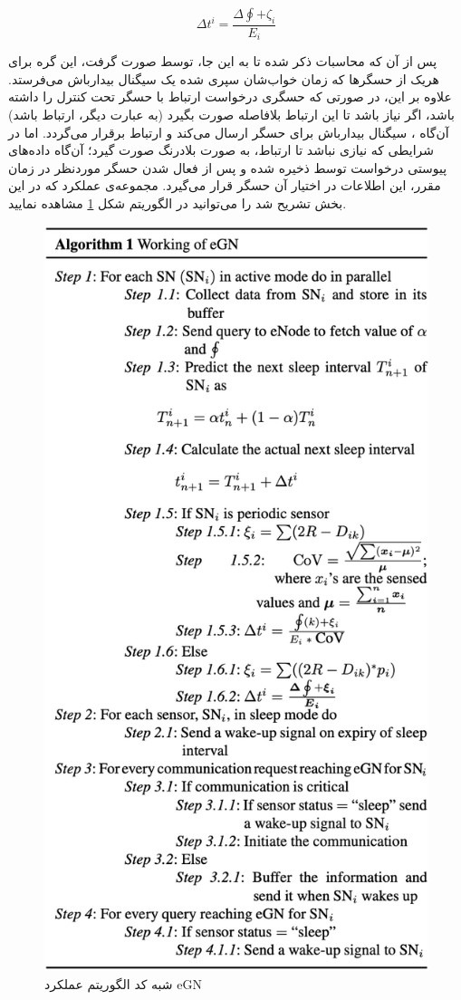 \begin{equation}
\Delta t^i = \frac{\Delta\oint + \zeta_i}{E_i}
\label{eq:3l-delta-tbd}
\end{equation}

\par
پس از آن که محاسبات ذکر شده تا به این جا، توسط  صورت گرفت، این گره برای هریک از حسگرها که زمان خواب‌شان سپری شده یک سیگنال بیدارباش می‌فرستد. علاوه بر این، در صورتی که حسگری درخواست ارتباط با حسگر تحت کنترل  را داشته باشد، اگر نیاز باشد تا این ارتباط بلافاصله صورت بگیرد (به عبارت دیگر، ارتباط  باشد) آن‌گاه ، سیگنال بیدارباش برای حسگر ارسال می‌کند و ارتباط برقرار می‌گردد. اما در شرایطی که نیازی نباشد تا ارتباط، به صورت بلادرنگ صورت گیرد؛ آن‌گاه داده‌های پیوستی درخواست توسط  ذخیره شده و پس از فعال شدن حسگر موردنظر در زمان مقرر، این اطلاعات در اختیار آن حسگر قرار می‌گیرد. مجموعه‌ی عملکرد  که در این بخش تشریح شد را می‌توانید در الگوریتم شکل \ref{fig:3l-al} مشاهده نمایید.

\begin{figure}
	\centering
	\includegraphics[width=0.7\linewidth]{figs/3l-al}
	\caption {شبه کد الگوریتم عملکرد eGN}
	\label{fig:3l-al}
\end{figure}


